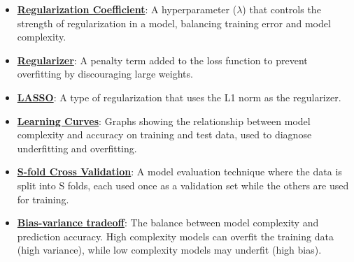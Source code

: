\documentclass{article}%
\begin{document}
\begin{itemize}[leftmargin=*]
\item \href{https://purdue.brightspace.com/d2l/common/assets/pdfjs-d2l-dist/1.0.14-legacy/web/viewer.html?file=\%2Fcontent\%2Fenforced\%2F1095467-wl.202510.CS.24300.001\%2F10L1-CrossValidation.pdf\%3Fou\%3D1095467\&lang=en-us\&container=d2l-fileviewer-rendered-pdf\&fullscreen=d2l-fileviewer-rendered-pdf-dialog\&height=667#page=17}{\textbf{Regularization Coefficient}}: A hyperparameter ($\lambda$) that controls the strength of regularization in a model, balancing training error and model complexity.%
\item \href{https://purdue.brightspace.com/d2l/common/assets/pdfjs-d2l-dist/1.0.14-legacy/web/viewer.html?file=\%2Fcontent\%2Fenforced\%2F1095467-wl.202510.CS.24300.001\%2F10L1-CrossValidation.pdf\%3Fou\%3D1095467\&lang=en-us\&container=d2l-fileviewer-rendered-pdf\&fullscreen=d2l-fileviewer-rendered-pdf-dialog\&height=667#page=17}{\textbf{Regularizer}}: A penalty term added to the loss function to prevent overfitting by discouraging large weights.%
\item \href{https://purdue.brightspace.com/d2l/common/assets/pdfjs-d2l-dist/1.0.14-legacy/web/viewer.html?file=\%2Fcontent\%2Fenforced\%2F1095467-wl.202510.CS.24300.001\%2F10L1-CrossValidation.pdf\%3Fou\%3D1095467\&lang=en-us\&container=d2l-fileviewer-rendered-pdf\&fullscreen=d2l-fileviewer-rendered-pdf-dialog\&height=667#page=17}{\textbf{LASSO}}: A type of regularization that uses the L1 norm as the regularizer.%
\item \href{https://purdue.brightspace.com/d2l/common/assets/pdfjs-d2l-dist/1.0.14-legacy/web/viewer.html?file=\%2Fcontent\%2Fenforced\%2F1095467-wl.202510.CS.24300.001\%2F10L1-CrossValidation.pdf\%3Fou\%3D1095467\&lang=en-us\&container=d2l-fileviewer-rendered-pdf\&fullscreen=d2l-fileviewer-rendered-pdf-dialog\&height=667#page=20}{\textbf{Learning Curves}}: Graphs showing the relationship between model complexity and accuracy on training and test data, used to diagnose underfitting and overfitting.%
\item \href{https://purdue.brightspace.com/d2l/common/assets/pdfjs-d2l-dist/1.0.14-legacy/web/viewer.html?file=\%2Fcontent\%2Fenforced\%2F1095467-wl.202510.CS.24300.001\%2F10L1-CrossValidation.pdf\%3Fou\%3D1095467\&lang=en-us\&container=d2l-fileviewer-rendered-pdf\&fullscreen=d2l-fileviewer-rendered-pdf-dialog\&height=667#page=25}{\textbf{S-fold Cross Validation}}: A model evaluation technique where the data is split into S folds, each used once as a validation set while the others are used for training.%
\item \href{https://purdue.brightspace.com/d2l/common/assets/pdfjs-d2l-dist/1.0.14-legacy/web/viewer.html?file=\%2Fcontent\%2Fenforced\%2F1095467-wl.202510.CS.24300.001\%2F11L2-svd-pca-recommender.pdf\%3Fou\%3D1095467\&lang=en-us\&container=d2l-fileviewer-rendered-pdf\&fullscreen=d2l-fileviewer-rendered-pdf-dialog\&height=667#page=53}{\textbf{Bias-variance tradeoff}}: The balance between model complexity and prediction accuracy. High complexity models can overfit the training data (high variance), while low complexity models may underfit (high bias).%

\end{itemize}
\end{document}
